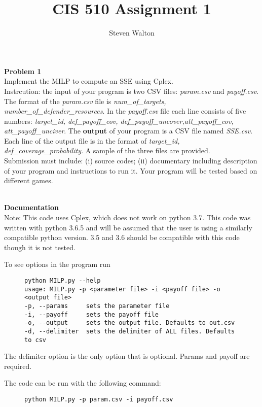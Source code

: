\documentclass[12pt,letter]{article}
\newcommand{\problem}[1]{\vspace{3mm}\Large\textbf{{Problem {#1}\vspace{3mm}}}\normalsize\\}
\newcommand{\documentation}[1]{\vspace{2mm}\large\textbf{\\Documentation{#1}\vspace{2mm}}\normalsize\\}
\begin{document}
\title{CIS 510 Assignment 1}
\author{Steven Walton}
\maketitle
\problem{1}
Implement the MILP to compute an SSE using Cplex.
\\
Instrcution: the input of your program is two CSV files: \textit{param.csv} and
\textit{payoff.csv}. The format of the \textit{param.csv} file is 
\textit{num\_of\_targets, number\_of\_defender\_resources}. In the \textit{payoff.csv} file
each line consists of five numbers: \textit{target\_id, def\_payoff\_cov, 
def\_payoff\_uncover,att\_payoff\_cov, att\_payoff\_unciver}. The \textbf{output}
of your program is a CSV file named \textit{SSE.csv}. Each line of the output file 
is in the format of \textit{target\_id, def\_coverage\_probability}. A sample
of the three files are provided. 
\\
Submission must include: (i) source codes; (ii) documentary including description
of your program and instructions to run it. Your program will be tested based on
different games.

\documentation{}
Note: This code uses Cplex, which does not work on python 3.7. This code was
written with python 3.6.5 and will be assumed that the user is using a similarly 
compatible python version. 3.5 and 3.6 should be compatible with this code
though it is not tested.

To see options in the program run
\begin{figure}[h]
    \centering
\begin{lstlisting}
python MILP.py --help
usage: MILP.py -p <parameter file> -i <payoff file> -o <output file>
-p, --params     sets the parameter file
-i, --payoff     sets the payoff file
-o, --output     sets the output file. Defaults to out.csv
-d, --delimiter  sets the delimiter of ALL files. Defaults to csv
\end{lstlisting}
\end{figure}
The delimiter option is the only option that is optional. Params and payoff
are required. 

The code can be run with the following command:
\begin{figure}[h]
    \centering
    \begin{lstlisting}
python MILP.py -p param.csv -i payoff.csv
    \end{lstlisting}
\end{figure}
\end{document}

